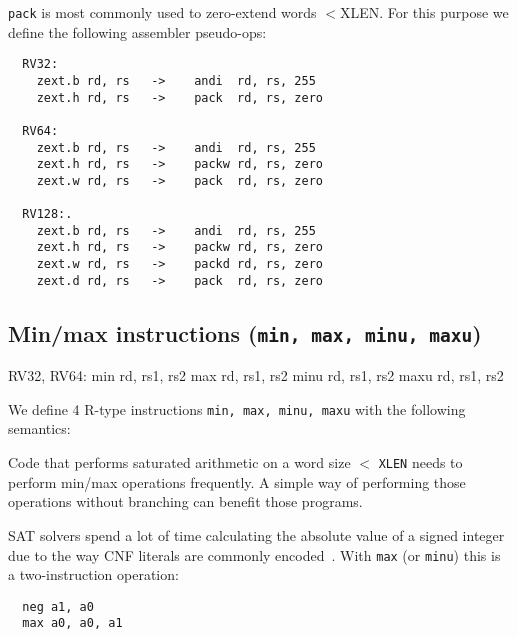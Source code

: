 {\tt pack} is most commonly used to zero-extend words $<$XLEN.
For this purpose we define the following assembler pseudo-ops:

\begin{minipage}{\linewidth}
\begin{verbatim}
  RV32:
    zext.b rd, rs   ->    andi  rd, rs, 255
    zext.h rd, rs   ->    pack  rd, rs, zero

  RV64:
    zext.b rd, rs   ->    andi  rd, rs, 255
    zext.h rd, rs   ->    packw rd, rs, zero
    zext.w rd, rs   ->    pack  rd, rs, zero

  RV128:.
    zext.b rd, rs   ->    andi  rd, rs, 255
    zext.h rd, rs   ->    packw rd, rs, zero
    zext.w rd, rs   ->    packd rd, rs, zero
    zext.d rd, rs   ->    pack  rd, rs, zero
\end{verbatim}
\end{minipage}


\subsection{Min/max instructions (\texttt{min, max, minu, maxu})}

\begin{rvb}
  RV32, RV64:
    min  rd, rs1, rs2
    max  rd, rs1, rs2
    minu rd, rs1, rs2
    maxu rd, rs1, rs2
\end{rvb}

We define 4 R-type instructions \texttt{min, max, minu, maxu} with the
following semantics:



Code that performs saturated arithmetic on a word size $<$ \texttt{XLEN} needs to perform
min/max operations frequently. A simple way of performing those operations without branching
can benefit those programs.

SAT solvers spend a lot of time calculating the absolute value of a signed
integer due to the way CNF literals are commonly encoded~\cite{BiereComm}. With
\texttt{max} (or \texttt{minu}) this is a two-instruction operation:

\begin{minipage}{\linewidth}
\begin{verbatim}
  neg a1, a0
  max a0, a0, a1
\end{verbatim}
\end{minipage}

